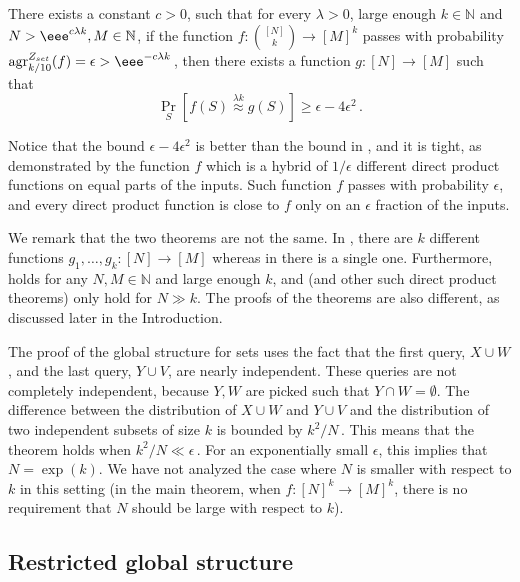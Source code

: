 \documentclass{toc}
\newcommand{\Prob}[2][]{\Pr_{{#1}}\left[#2\right]} %
\newcommand\f{f} %
\newcommand\pf{g} %
\newcommand{\test}[2]{
	\ifx &#2&
	\textrm{agr}^{#1}
	\else	
	\textrm{agr}^{#1}_{#2}
	\fi}
\newcommand\neql[1]{\stackrel{{#1}}{ \approx}} %
\newcommand{\sets}{\binom{[N]}{k}} %
\begin{document}
\begin{theorem}\label{thm:global structure for sets}
There exists a %
constant $c>0$, such that for every %
%
%
$\lambda>0$, large enough $k\in\mathbb{N}$ and $N > \eee^{c\lambda k},M\in\mathbb{N}$, if the function $\f:\sets\rightarrow[M]^k$ passes  with probability $\test{Z_{set}}{k/10}(f)=\epsilon > \eee^{-c\lambda k}$\,, then there exists a function $\pf:[N]\rightarrow[M]$ such that
\[ \Prob[S]{\f(S)\neql{\lambda k}\pf(S)} \geq \epsilon - 4\epsilon^2 \,.\] %
\end{theorem}
Notice that the bound $\epsilon - 4\epsilon^2$ is better than the bound in , and it is tight, %
as demonstrated by the function $\f$ which is a hybrid of 
%
%
%
$1/\epsilon$ %
different direct product functions on %
equal  %
parts of the inputs. Such function $\f$ passes  with probability $\epsilon$, and every direct product function is close to $\f$ only on an $\epsilon$ fraction of the inputs.

We remark that the two theorems are not the same. In , there are $k$ different functions $\pf_1,\ldots,\pf_k:[N]\rightarrow[M]$ whereas in  there is a single one. Furthermore,  holds for any $N,M\in \mathbb{N}$ and large enough $k$, and  (and other such direct product theorems) only %
hold  %
for $N\gg k$. 
The proofs of the theorems are also different, %
as  %
discussed later in the %
Introduction.  %

The proof of the global structure for sets uses the fact that the first query, $X\cup W$, and the last query, $Y\cup V$, are nearly independent. These queries are not completely independent, because $Y,W$ are picked such that $Y\cap W=\emptyset$. The difference between the distribution of $X\cup W$ and $Y\cup V$ and the distribution of two independent subsets of size $k$ is bounded by $k^2/N$\,. %
%
%
%
This means that the theorem holds when %
%
$k^2/N\ll \epsilon$\,. %
For an exponentially small $\epsilon$, this implies that $N = \exp(k)$. We have not analyzed the case where $N$ is smaller with respect to $k$ in this setting 
%
(in the main theorem, when $f:[N]^k\rightarrow[M]^k$, there is no requirement that $N$ should be large with respect to $k$). %
%
%
%
\subsection{Restricted global structure}
%
\end{document}
